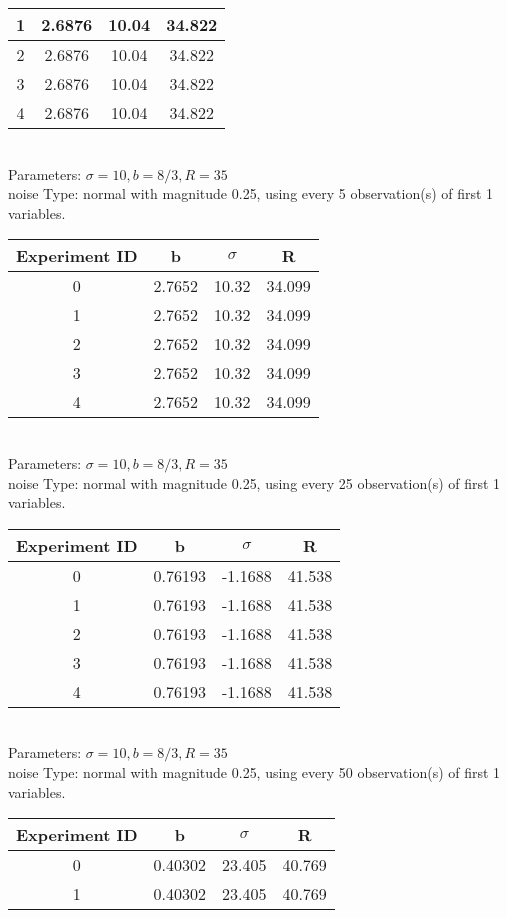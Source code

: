 \begin{multicols}{3}
\begin{tabular}{cccc}
 1 & 2.6876 & 10.04 & 34.822\\ \hline 
 2 & 2.6876 & 10.04 & 34.822\\ \hline 
 3 & 2.6876 & 10.04 & 34.822\\ \hline 
 4 & 2.6876 & 10.04 & 34.822\\ \hline 
 \end{tabular}\\
Parameters: $\sigma=10, b=8/3, R=35$\\
noise Type: normal with magnitude 0.25, using every 5 observation(s) of first 1 variables.\\
\begin{tabular}{cccc}
\hline Experiment ID & b & $\sigma$ & R \\ \hline 
0 & 2.7652 & 10.32 & 34.099\\ \hline 
 1 & 2.7652 & 10.32 & 34.099\\ \hline 
 2 & 2.7652 & 10.32 & 34.099\\ \hline 
 3 & 2.7652 & 10.32 & 34.099\\ \hline 
 4 & 2.7652 & 10.32 & 34.099\\ \hline 
 \end{tabular}\\
Parameters: $\sigma=10, b=8/3, R=35$\\
noise Type: normal with magnitude 0.25, using every 25 observation(s) of first 1 variables.\\
\begin{tabular}{cccc}
\hline Experiment ID & b & $\sigma$ & R \\ \hline 
0 & 0.76193 & -1.1688 & 41.538\\ \hline 
 1 & 0.76193 & -1.1688 & 41.538\\ \hline 
 2 & 0.76193 & -1.1688 & 41.538\\ \hline 
 3 & 0.76193 & -1.1688 & 41.538\\ \hline 
 4 & 0.76193 & -1.1688 & 41.538\\ \hline 
 \end{tabular}\\
Parameters: $\sigma=10, b=8/3, R=35$\\
noise Type: normal with magnitude 0.25, using every 50 observation(s) of first 1 variables.\\
\begin{tabular}{cccc}
\hline Experiment ID & b & $\sigma$ & R \\ \hline 
0 & 0.40302 & 23.405 & 40.769\\ \hline 
 1 & 0.40302 & 23.405 & 40.769\\ \hline 

\end{tabular}
\end{multicols}
